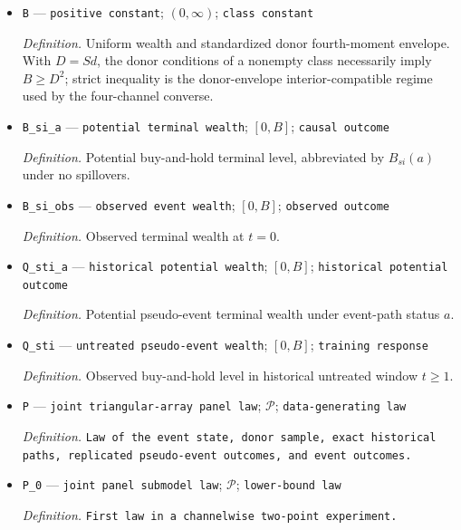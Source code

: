 \documentclass{article}
\begin{document}
\begin{itemize}
  \par\smallskip\noindent\emph{Definition.} \(D=Sd\).
  \item \texttt{B} --- \texttt{positive constant}; \((0,\infty)\); \texttt{class constant}
  \par\smallskip\noindent\emph{Definition.} Uniform wealth and standardized donor fourth-moment envelope.  With \(D=Sd\), the donor conditions of a nonempty class necessarily imply \(B\ge D^2\); strict inequality is the donor-envelope interior-compatible regime used by the four-channel converse.
  \item \texttt{B\_\allowbreak{}si\_\allowbreak{}a} --- \texttt{potential terminal wealth}; \([0,B]\); \texttt{causal outcome}
  \par\smallskip\noindent\emph{Definition.} Potential buy-and-hold terminal level, abbreviated by \(B_{si}(a)\) under no spillovers.
  \item \texttt{B\_\allowbreak{}si\_\allowbreak{}obs} --- \texttt{observed event wealth}; \([0,B]\); \texttt{observed outcome}
  \par\smallskip\noindent\emph{Definition.} Observed terminal wealth at \(t=0\).
  \item \texttt{Q\_\allowbreak{}sti\_\allowbreak{}a} --- \texttt{historical potential wealth}; \([0,B]\); \texttt{historical potential outcome}
  \par\smallskip\noindent\emph{Definition.} Potential pseudo-event terminal wealth under event-path status \(a\).
  \item \texttt{Q\_\allowbreak{}sti} --- \texttt{untreated pseudo-\allowbreak{}event wealth}; \([0,B]\); \texttt{training response}
  \par\smallskip\noindent\emph{Definition.} Observed buy-and-hold level in historical untreated window \(t\ge1\).
  \item \texttt{P} --- \texttt{joint triangular-\allowbreak{}array panel law}; \(\mathcal P\); \texttt{data-\allowbreak{}generating law}
  \par\smallskip\noindent\emph{Definition.} \texttt{Law of the event state,\allowbreak{} donor sample,\allowbreak{} exact historical paths,\allowbreak{} replicated pseudo-\allowbreak{}event outcomes,\allowbreak{} and event outcomes.}
  \item \texttt{P\_\allowbreak{}0} --- \texttt{joint panel submodel law}; \(\mathcal P\); \texttt{lower-\allowbreak{}bound law}
  \par\smallskip\noindent\emph{Definition.} \texttt{First law in a channelwise two-\allowbreak{}point experiment.}

\end{itemize}
\end{document}
